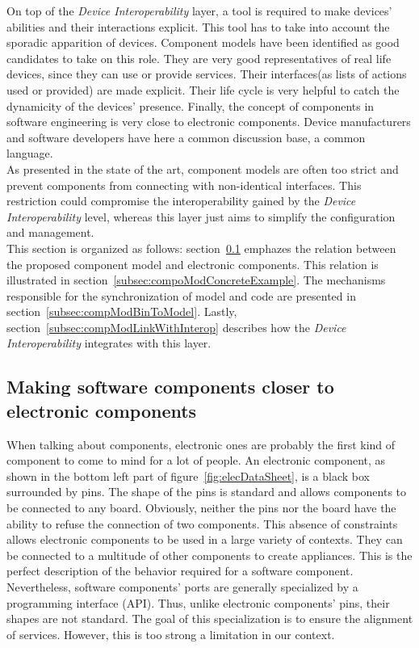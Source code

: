 On top of the {\it Device Interoperability} layer, a tool is required to make devices' abilities and their interactions explicit. This tool has to take into account the sporadic apparition of devices. Component models have been identified as good candidates to take on this role. They are very good representatives of real life devices, since they can use or provide services. Their interfaces(as lists of actions used or provided) are made explicit. Their life cycle is very helpful to catch the dynamicity of the devices' presence. Finally, the concept of components in software engineering is very close to electronic components.
Device manufacturers and software developers have here a common discussion base, a common language.\\
As presented in the state of the art, component models are often too strict and prevent components from connecting with non-identical interfaces. This restriction could compromise the interoperability gained by the {\it Device Interoperability} level, whereas this layer just aims to simplify the configuration and management.\\

This section is organized as follows: section~\ref{subsec:makeSoftCloserToElec} emphazes the relation between the proposed component model and electronic components. This relation is illustrated in section~\ref{subsec:compoModConcreteExample}. The mechanisms responsible for the synchronization of model and code are presented in section~\ref{subsec:compModBinToModel}. Lastly, section~\ref{subsec:compModLinkWithInterop} describes how the {\it Device Interoperability} integrates with this layer.


\subsection{Making software components closer to electronic components}
\label{subsec:makeSoftCloserToElec}

When talking about components, electronic ones are probably the first kind of component to come to mind for a lot of people. An electronic component, as shown in the bottom left part of figure~\ref{fig:elecDataSheet}, is a black box surrounded by pins. The shape of the pins is standard and allows components to be connected to any board. Obviously, neither the pins nor the board have the ability to refuse the connection of two components. This absence of constraints allows electronic components to be used in a large variety of contexts. They can be connected to a multitude of other components to create appliances. This is the perfect description of the behavior required for a software component.\\
Nevertheless, software components' ports are generally specialized by a programming interface (API). Thus, unlike electronic components' pins, their shapes are not standard. The goal of this specialization is to ensure the alignment of services. However, this is too strong a limitation in our context.\\

